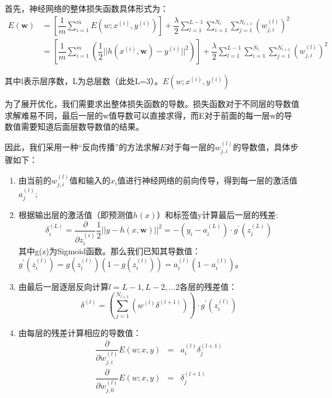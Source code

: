 首先，神经网络的整体损失函数具体形式为：
\begin{equation}
\begin{aligned}
E(\mathbf{w}) & = [\dfrac{1}{m} \sum^m_{i=1} E(w;x^{(i)},y^{(i)})] + \dfrac{\lambda}{2} \sum^{L-1}_{l=1} \sum^{N_l}_{i=1} \sum^{N_{l+1}}_{j=1} (w^{(l)}_{j,i})^2 \\
& = [\dfrac{1}{m} \sum^m_{i=1}(\dfrac{1}{2}||h(x^{(i)},\mathbf{w})-y^{(i)}||^2)] + \dfrac{\lambda}{2} \sum^{L-1}_{l=1} \sum^{N_l}_{i=1} \sum^{N_{l+1}}_{j=1} (w^{(l)}_{j,i})^2
\end{aligned}
\end{equation}

其中l表示层序数，L为总层数（此处L=3）。$E(w;x^{(i)},y^{(i)})$

为了展开优化，我们需要求出整体损失函数的导数。损失函数对于不同层的导数值求解难易不同，最后一层的w值导数可以直接求得，而E对于前面的每一层w的导数值需要知道后面层数导数值的结果。

因此，我们采用一种“反向传播”的方法求解$E$对于每一层的$w^{(l)}_{j,i}$的导数值\cite{deep_learning_ufldl}，具体步骤如下：
\begin{enumerate}
\label{enu: backprop}
\item 由当前的$w^{(l)}_{j,i}$值和输入的$x_i$值进行神经网络的前向传导，得到每一层的激活值$a^{(l)}_j$;
\item 根据输出层的激活值（即预测值$h(x)$）和标签值y计算最后一层的残差:
\begin{equation}
\delta^{(L)}_i = \dfrac{\partial}{\partial z^{(i)}_i} \dfrac{1}{2} ||y - h(x,\mathbf{w})||^2 = -(y_i - a^{(L)}_i) \cdot g^\prime (z^{(L)}_i)
\end{equation}
其中g(z)为Sigmoid函数。那么我们已知其导数值：$g^\prime(z^{(l)}_i) = g(z^{(l)}_i)(1-g(z^{(l)}_i)) = a^{(l)}_i(1-a^{(l)}_i)$。
\item 由最后一层逐层反向计算$l = L-1, L-2, ...2$各层的残差值：
\begin{equation}
\delta^(l) = (\sum^{N_{l+1}}_{j=1}(w^{(l)}\delta^{(l+1)})) \cdot g^\prime (z^{(l)}_i)
\end{equation}
\item 由每层的残差计算相应的导数值：
\begin{equation}
\begin{aligned}
\dfrac{\partial}{\partial w^{(l)}_{j,i}} E(w;x,y) & = & a^{(l)}_i \delta^{(l+1)}_j \\
\dfrac{\partial}{\partial w^{(l)}_{j,0}} E(w;x,y) & = & \delta^{(l+1)}_j
\end{aligned}
\end{equation}
\end{enumerate}


